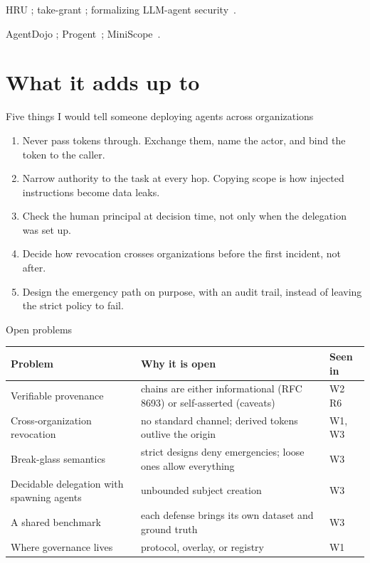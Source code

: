 \documentclass[aspectratio=169, 10pt]{beamer}
\begin{document}
{HRU ; take-grant ; formalizing LLM-agent security \,\pre. }

{AgentDojo ; Progent \,\pre; MiniScope \,\pre. }

\section{What it adds up to}

\begin{frame}{Five things I would tell someone deploying agents across organizations}
  \begin{enumerate}
    \item Never pass tokens through. Exchange them, name the actor, and bind the token to the caller.
    \item Narrow authority to the task at every hop. Copying scope is how injected instructions become data leaks.
    \item Check the human principal at decision time, not only when the delegation was set up.
    \item Decide how revocation crosses organizations before the first incident, not after.
    \item Design the emergency path on purpose, with an audit trail, instead of leaving the strict policy to fail.
  \end{enumerate}
\end{frame}

\begin{frame}{Open problems}
  \small
  \begin{tabularx}{\textwidth}{@{}l X l@{}}
    \toprule
    \textbf{Problem} & \textbf{Why it is open} & \textbf{Seen in} \\
    \midrule
    Verifiable provenance & chains are either informational (RFC 8693) or self-asserted (caveats) & W2 R6 \\
    Cross-organization revocation & no standard channel; derived tokens outlive the origin & W1, W3 \\
    Break-glass semantics & strict designs deny emergencies; loose ones allow everything & W3 \\
    Decidable delegation with spawning agents & unbounded subject creation & W3 \\
    A shared benchmark & each defense brings its own dataset and ground truth & W3 \\
    Where governance lives & protocol, overlay, or registry & W1 \\
    \bottomrule
  \end{tabularx}
\end{frame}
\end{document}
